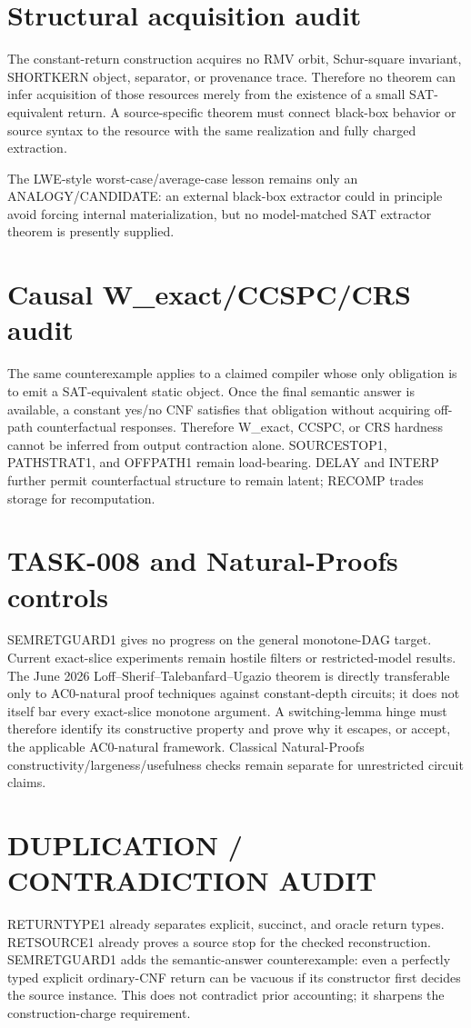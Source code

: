 \documentclass[11pt]{article}
\begin{document}
\section*{Structural acquisition audit}
The constant-return construction acquires no RMV orbit, Schur-square invariant, SHORTKERN object, separator, or provenance trace. Therefore no theorem can infer acquisition of those resources merely from the existence of a small SAT-equivalent return. A source-specific theorem must connect black-box behavior or source syntax to the resource with the same realization and fully charged extraction.

The LWE-style worst-case/average-case lesson remains only an ANALOGY/CANDIDATE: an external black-box extractor could in principle avoid forcing internal materialization, but no model-matched SAT extractor theorem is presently supplied.

\section*{Causal W\_exact/CCSPC/CRS audit}
The same counterexample applies to a claimed compiler whose only obligation is to emit a SAT-equivalent static object. Once the final semantic answer is available, a constant yes/no CNF satisfies that obligation without acquiring off-path counterfactual responses. Therefore W\_exact, CCSPC, or CRS hardness cannot be inferred from output contraction alone. SOURCESTOP1, PATHSTRAT1, and OFFPATH1 remain load-bearing. DELAY and INTERP further permit counterfactual structure to remain latent; RECOMP trades storage for recomputation.

\section*{TASK-008 and Natural-Proofs controls}
SEMRETGUARD1 gives no progress on the general monotone-DAG target. Current exact-slice experiments remain hostile filters or restricted-model results. The June 2026 Loff--Sherif--Talebanfard--Ugazio theorem is directly transferable only to AC0-natural proof techniques against constant-depth circuits; it does not itself bar every exact-slice monotone argument. A switching-lemma hinge must therefore identify its constructive property and prove why it escapes, or accept, the applicable AC0-natural framework. Classical Natural-Proofs constructivity/largeness/usefulness checks remain separate for unrestricted circuit claims.

\section*{DUPLICATION / CONTRADICTION AUDIT}
RETURNTYPE1 already separates explicit, succinct, and oracle return types. RETSOURCE1 already proves a source stop for the checked reconstruction. SEMRETGUARD1 adds the semantic-answer counterexample: even a perfectly typed explicit ordinary-CNF return can be vacuous if its constructor first decides the source instance. This does not contradict prior accounting; it sharpens the construction-charge requirement.
\end{document}
